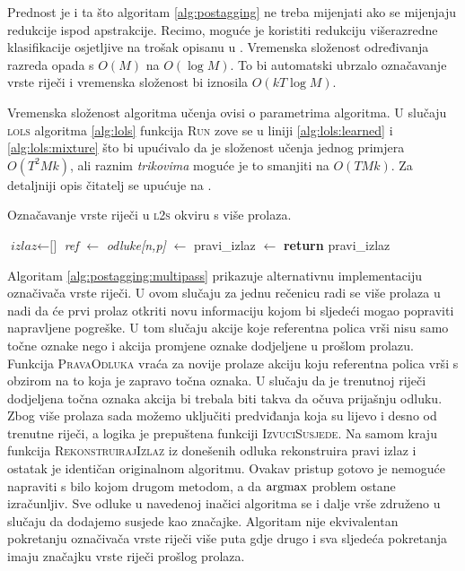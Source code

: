 Prednost je i ta što algoritam \ref{alg:postagging} ne treba mijenjati ako se
mijenjaju redukcije ispod apstrakcije. Recimo, moguće je koristiti redukciju
višerazredne klasifikacije osjetljive na trošak opisanu u
\citep{beygelzimer2009error}. Vremenska složenost određivanja razreda opada s
$O(M)$ na $O(\log M)$. To bi automatski ubrzalo označavanje vrste riječi i
vremenska složenost bi iznosila $O(k T \log M)$.

Vremenska složenost algoritma učenja ovisi o parametrima algoritma. U slučaju
\textsc{lols} algoritma \ref{alg:lols} funkcija \textsc{Run} zove se u liniji
\ref{alg:lols:learned} i \ref{alg:lols:mixture} što bi upućivalo da je složenost
učenja jednog primjera $O(T ^ 2 M k)$, ali raznim \textit{trikovima} moguće je
to smanjiti na $O(T M k)$. Za detaljniji opis čitatelj se upućuje na
\citep{daume14lts}.

\begin{algorithm}
\caption{Označavanje vrste riječi u \textsc{l2s} okviru s više prolaza.}\label{alg:postagging:multipass}
\begin{algorithmic}[1]
\State $\textit{izlaz} \gets \text{[]}$
    \State \textit{ref} $\gets$ 
    \State \textit{odluke[n,p]} $\gets$ 
  \EndFor
\EndFor
\State pravi\_izlaz $\gets$ 
\State {}
\State \textbf{return} pravi\_izlaz
\EndFunction
\end{algorithmic}
\end{algorithm}

Algoritam \ref{alg:postagging:multipass} prikazuje alternativnu implementaciju
označivača vrste riječi. U ovom slučaju za jednu rečenicu radi se više prolaza u
nadi da će prvi prolaz otkriti novu informaciju kojom bi sljedeći mogao
popraviti napravljene pogreške. U tom slučaju akcije koje referentna polica vrši
nisu samo točne oznake nego i akcija promjene oznake dodjeljene u prošlom
prolazu. Funkcija \textsc{PravaOdluka} vraća za novije prolaze akciju koju
referentna polica vrši s obzirom na to koja je zapravo točna oznaka. U slučaju
da je trenutnoj riječi dodjeljena točna oznaka akcija bi trebala biti takva da
očuva prijašnju odluku. Zbog više prolaza sada možemo uključiti predviđanja koja
su lijevo i desno od trenutne riječi, a logika je prepuštena funkciji
\textsc{IzvuciSusjede}. Na samom kraju funkcija \textsc{RekonstruirajIzlaz} iz
donešenih odluka rekonstruira pravi izlaz i ostatak je identičan originalnom
algoritmu. Ovakav pristup gotovo je nemoguće napraviti s bilo kojom drugom
metodom, a da $\operatorname*{argmax}$ problem ostane izračunljiv. Sve odluke u navedenoj
inačici algoritma se i dalje vrše združeno u slučaju da dodajemo susjede kao
značajke. Algoritam nije ekvivalentan pokretanju označivača vrste riječi više
puta gdje drugo i sva sljedeća pokretanja imaju značajku vrste riječi prošlog
prolaza.
